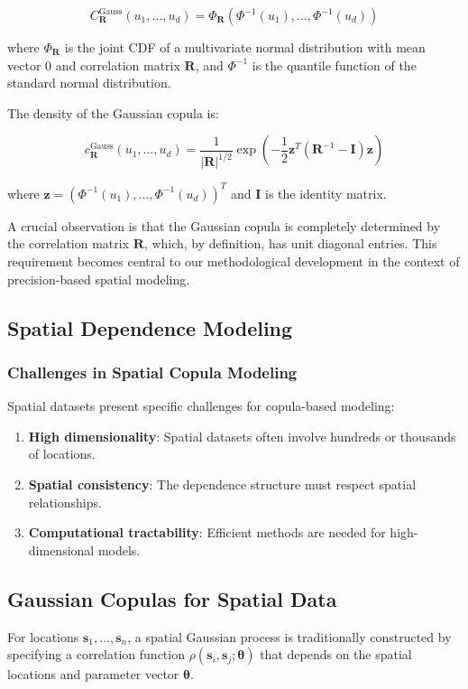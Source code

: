 \begin{equation}
C_{\mathbf{R}}^{\text{Gauss}}(u_1, \ldots, u_d) = \Phi_{\mathbf{R}}(\Phi^{-1}(u_1), \ldots, \Phi^{-1}(u_d))
\end{equation}

where $\Phi_{\mathbf{R}}$ is the joint CDF of a multivariate normal distribution with mean vector 0 and correlation matrix $\mathbf{R}$, and $\Phi^{-1}$ is the quantile function of the standard normal distribution.

The density of the Gaussian copula is:

\begin{equation}
c_{\mathbf{R}}^{\text{Gauss}}(u_1, \ldots, u_d) = \frac{1}{|\mathbf{R}|^{1/2}} \exp\left(-\frac{1}{2}\mathbf{z}^T(\mathbf{R}^{-1} - \mathbf{I})\mathbf{z}\right)
\end{equation}

where $\mathbf{z} = (\Phi^{-1}(u_1), \ldots, \Phi^{-1}(u_d))^T$ and $\mathbf{I}$ is the identity matrix.

A crucial observation is that the Gaussian copula is completely determined by the correlation matrix $\mathbf{R}$, which, by definition, has unit diagonal entries. This requirement becomes central to our methodological development in the context of precision-based spatial modeling.

\subsection{Spatial Dependence Modeling}

\subsubsection{Challenges in Spatial Copula Modeling}
Spatial datasets present specific challenges for copula-based modeling:

\begin{enumerate}
\item \textbf{High dimensionality}: Spatial datasets often involve hundreds or thousands of locations.
\item \textbf{Spatial consistency}: The dependence structure must respect spatial relationships.
\item \textbf{Computational tractability}: Efficient methods are needed for high-dimensional models.
\end{enumerate}

\subsection{Gaussian Copulas for Spatial Data}
For locations $\mathbf{s}_1, \ldots, \mathbf{s}_n$, a spatial Gaussian process is traditionally constructed by specifying a correlation function $\rho(\mathbf{s}_i, \mathbf{s}_j; \boldsymbol{\theta})$ that depends on the spatial locations and parameter vector $\boldsymbol{\theta}$.

